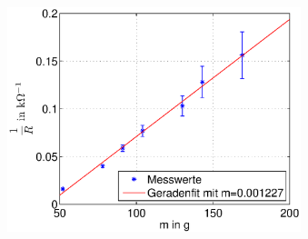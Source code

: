 \begin{frame}
\begin{columns}[c]
\begin{figure}[H]
         \end{figure}
         \begin{figure}[H]
         \begin{center}
                 \includegraphics[scale=0.2]{./img/plots/1d_inv.eps}
         \end{center}
         \end{figure}
     \end{columns}
\end{frame}
